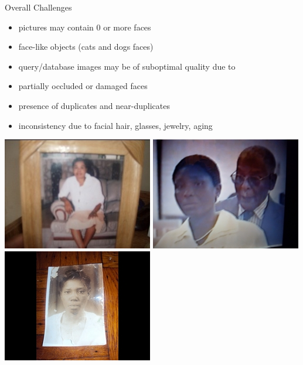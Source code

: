 \begin{xpsectionbox}{Overall Challenges}{}

\begin{minipage}{0.45\linewidth}
\begin{itemize}
	\item pictures may contain $0$ or more faces
	\item face-like objects (cats and dogs faces)
	\item query/database images may be of suboptimal quality due to
	\item partially occluded or damaged faces
	\item presence of duplicates and near-duplicates
	\item inconsistency due to facial hair, glasses, jewelry, aging
\end{itemize}
\end{minipage}
\begin{minipage}{0.55\linewidth}
\begin{center}

			\vspace{-1cm}
			
			\includegraphics[height=0.22\linewidth]{images/PL_low_quality}
			\includegraphics[height=0.22\linewidth]{images/HEPL_low_quality}
			\includegraphics[height=0.22\linewidth]{images/HEPL_picture_photo}

			\vspace{0.2cm}			
			

\end{center}
\end{minipage}
\end{xpsectionbox}
